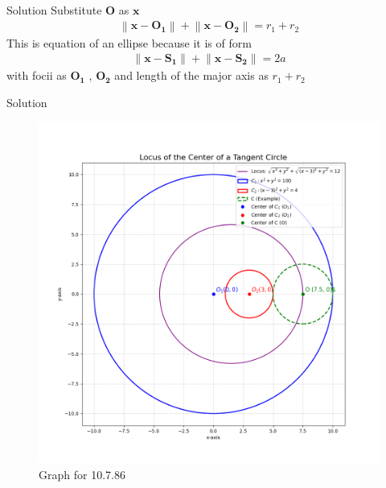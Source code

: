 \documentclass{beamer}
\let\vec\mathbf
\theoremstyle{remark}
\providecommand{\norm}[1]{\left\lVert#1\right\rVert}
\begin{document}
\begin{frame}{Solution}
Substitute $\vec{O}$ as $\vec{x}$
\begin{align}
    \norm{\vec{x} - \vec{O_1}} + \norm{\vec{x} - \vec{O_2}} = r_1 + r_2
\end{align}
This is equation of an ellipse because it is of form 
\begin{align}
    \norm{\vec{x} - \vec{S_1}} + \norm{\vec{x} - \vec{S_2}} = 2a
\end{align}
with focii  as $\vec{O_1}$ , $\vec{O_2}$ and length of the major axis as $r_1 + r_2$
\end{frame}
\begin{frame}{Solution}
    \begin{figure}[H]
        \centering
        \includegraphics[width=0.5\columnwidth]{figs/1.png}
        \caption{Graph for 10.7.86}
        \label{fig:placeholder}
    \end{figure}
\end{frame}
\end{document}
